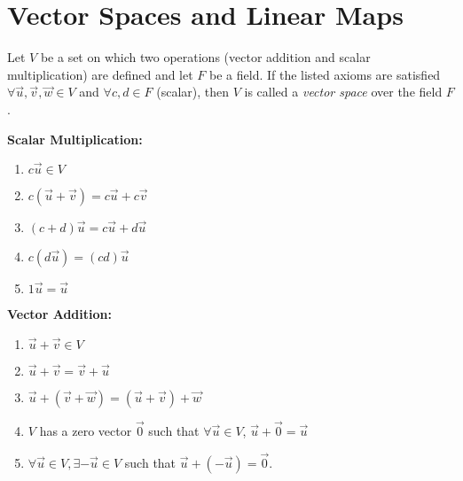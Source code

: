 \section{Vector Spaces and Linear Maps}

\begin{definition} \label{vectspace}
	\emph{\cite{larson}} Let $V$ be a set on which two operations (vector addition and scalar multiplication) are defined and let $F$ be a field. If the listed axioms are satisfied $\forall \vec{u},\vec{v},\vec{w} \in V$ and $\forall c,d \in F$ (scalar), then $V$ is called a \emph{vector space} over the field $F$.
	\begin{varwidth}[t]{.35\textwidth}
\textbf{Scalar Multiplication:}
\begin{enumerate}
\item $c\vec{u} \in V$
\item $c(\vec{u}+\vec{v}) = c\vec{u}+c\vec{v}$
\item $(c+d)\vec{u} = c\vec{u}+d\vec{u}$
\item $c(d\vec{u}) = (cd)\vec{u}$
\item $1\vec{u} = \vec{u}$
\end{enumerate}
\end{varwidth}%
\begin{varwidth}[t]{.65\textwidth}
\textbf{Vector Addition:} 
\begin{enumerate}
\item $\vec{u}+\vec{v} \in V$
\item $\vec{u}+\vec{v} = \vec{v}+\vec{u}$
\item $\vec{u}+(\vec{v}+\vec{w}) = (\vec{u}+\vec{v})+\vec{w}$
\item $V$ has a zero vector $\vec{0}$ such that $\forall \vec{u} \in V$, $\vec{u}+\vec{0} = \vec{u}$
\item $\forall \vec{u} \in V, \exists -\vec{u} \in V$ such that $\vec{u}+(-\vec{u}) = \vec{0}$.
\end{enumerate}
\end{varwidth}
\newline
\end{definition}

\newline
\newline

